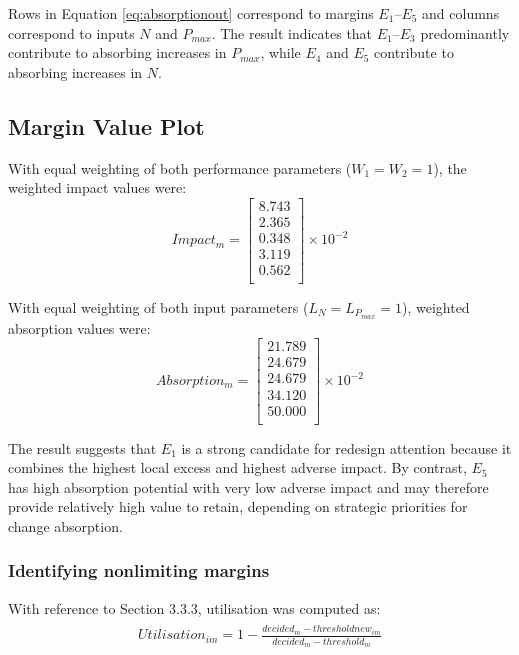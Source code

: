 Rows in Equation \ref{eq:absorptionout} correspond to margins $E_1$--$E_5$ and columns correspond to inputs $N$ and $P_{max}$. The result indicates that $E_1$--$E_3$ predominantly contribute to absorbing increases in $P_{max}$, while $E_4$ and $E_5$ contribute to absorbing increases in $N$.

\subsection{Margin Value Plot}

With equal weighting of both performance parameters ($W_1=W_2=1$), the weighted impact values were:
\begin{equation} \label{eq:impactmout} Impact_{m}= \begin{bmatrix}
8.743\\
2.365\\
0.348\\
3.119\\
0.562\\
\end{bmatrix} \times 10^{-2} \end{equation}

With equal weighting of both input parameters ($L_N=L_{P_{max}}=1$), weighted absorption values were:
\begin{equation} \label{eq:likelihoodmout} Absorption_{m}= \begin{bmatrix}
21.789\\
24.679\\
24.679\\
34.120\\
50.000\\
\end{bmatrix} \times 10^{-2} \end{equation}
 
The result suggests that $E_1$ is a strong candidate for redesign attention because it combines the highest local excess and highest adverse impact. By contrast, $E_5$ has high absorption potential with very low adverse impact and may therefore provide relatively high value to retain, depending on strategic priorities for change absorption.

\subsubsection{Identifying nonlimiting margins}

With reference to Section 3.3.3, utilisation was computed as:
\begin{align}
\begin{split}
\label{eq:utilisationeq}
Utilisation_{im}= 1 - \frac{decided_{m} - thresholdnew_{im}}{decided_{m} - threshold_m}
\end{split}
\end{align}

